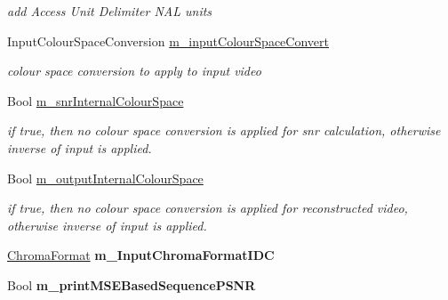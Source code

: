 \begin{DoxyCompactItemize}
\begin{DoxyCompactList}\small\item\em add Access Unit Delimiter N\+AL units \end{DoxyCompactList}\item 
\mbox{\label{class_t_app_enc_cfg_ae58ea1b4272f242160b082f0c3bc1cd7}} 
Input\+Colour\+Space\+Conversion \hyperlink{class_t_app_enc_cfg_ae58ea1b4272f242160b082f0c3bc1cd7}{m\+\_\+input\+Colour\+Space\+Convert}
\begin{DoxyCompactList}\small\item\em colour space conversion to apply to input video \end{DoxyCompactList}\item 
\mbox{\label{class_t_app_enc_cfg_a03874abf3018a6713d96f5c023b6befc}} 
Bool \hyperlink{class_t_app_enc_cfg_a03874abf3018a6713d96f5c023b6befc}{m\+\_\+snr\+Internal\+Colour\+Space}
\begin{DoxyCompactList}\small\item\em if true, then no colour space conversion is applied for snr calculation, otherwise inverse of input is applied. \end{DoxyCompactList}\item 
\mbox{\label{class_t_app_enc_cfg_adda786f1b6d85ad792771096cc053b91}} 
Bool \hyperlink{class_t_app_enc_cfg_adda786f1b6d85ad792771096cc053b91}{m\+\_\+output\+Internal\+Colour\+Space}
\begin{DoxyCompactList}\small\item\em if true, then no colour space conversion is applied for reconstructed video, otherwise inverse of input is applied. \end{DoxyCompactList}\item 
\mbox{\label{class_t_app_enc_cfg_a77613cb23db95a0e94a0ce42b5342ccb}} 
\hyperlink{_type_def_8h_a4a6c51c10f2eb04abc7209db7caff39f}{Chroma\+Format} {\bfseries m\+\_\+\+Input\+Chroma\+Format\+I\+DC}
\item 
\mbox{\label{class_t_app_enc_cfg_a7d8f3934d3d17b6e73effc319dee8572}} 
Bool {\bfseries m\+\_\+print\+M\+S\+E\+Based\+Sequence\+P\+S\+NR}
\item 
\mbox{\label{class_t_app_enc_cfg_a7e1fb861039bedb8ee629109cfb67e0b}} 

\end{DoxyCompactItemize}
